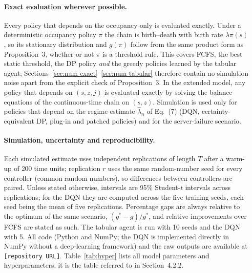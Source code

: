 \paragraph{Exact evaluation wherever possible.} Every policy that depends on the occupancy only is evaluated exactly. Under a deterministic occupancy policy $\pi$ the chain is birth--death with birth rate $\lambda\pi(s)$, so its stationary distribution and $g(\pi)$ follow from the same product form as Proposition~3, whether or not $\pi$ is a threshold rule. This covers FCFS, the best static threshold, the DP policy \emph{and} the greedy policies learned by the tabular agent; Sections~\ref{sec:num-exact}--\ref{sec:num-tabular} therefore contain no simulation noise apart from the explicit check of Proposition~3. In the extended model, any policy that depends on $(s,z,j)$ is evaluated exactly by solving the balance equations of the continuous-time chain on $(s,z)$. Simulation is used only for policies that depend on the regime estimate $\hat\lambda_n$ of Eq.~(7) (DQN, certainty-equivalent DP, plug-in and patched policies) and for the server-failure scenario.

\paragraph{Simulation, uncertainty and reproducibility.} Each simulated estimate uses independent replications of length $T$ after a warm-up of 200 time units; replication $r$ uses the same random-number seed for every controller (common random numbers), so differences between controllers are paired. Unless stated otherwise, intervals are 95\% Student-$t$ intervals across replications; for the DQN they are computed across the five training seeds, each seed being the mean of five replications. Percentage gaps are always relative to the optimum of the same scenario, $(g^*-g)/g^*$, and relative improvements over FCFS are stated as such. The tabular agent is run with 10 seeds and the DQN with 5. All code (Python and NumPy; the DQN is implemented directly in NumPy without a deep-learning framework) and the raw outputs are available at \texttt{[repository URL]}. Table~\ref{tab:hyper} lists all model parameters and hyperparameters; it is the table referred to in Section~4.2.2.


